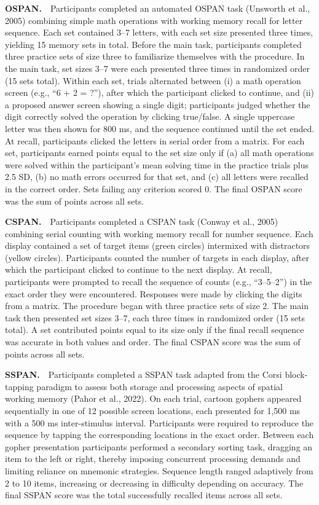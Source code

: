 \documentclass[
  ,man]{apa6}
\begin{document}
\textbf{OSPAN.}\(\quad\)Participants completed an automated OSPAN task (Unsworth et al., 2005) combining simple math operations with working memory recall for letter sequence. Each set contained 3--7 letters, with each set size presented three times, yielding 15 memory sets in total. Before the main task, participants completed three practice sets of size three to familiarize themselves with the procedure. In the main task, set sizes 3--7 were each presented three times in randomized order (15 sets total). Within each set, trials alternated between (i) a math operation screen (e.g., ``6 + 2 = ?''), after which the participant clicked to continue, and (ii) a proposed answer screen showing a single digit; participants judged whether the digit correctly solved the operation by clicking true/false. A single uppercase letter was then shown for 800 ms, and the sequence continued until the set ended. At recall, participants clicked the letters in serial order from a matrix. For each set, participants earned points equal to the set size only if (a) all math operations were solved within the participant's mean solving time in the practice trials plus 2.5 SD, (b) no math errors occurred for that set, and (c) all letters were recalled in the correct order. Sets failing any criterion scored 0. The final OSPAN score was the sum of points across all sets.

\textbf{CSPAN.}\(\quad\)Participants completed a CSPAN task (Conway et al., 2005) combining serial counting with working memory recall for number sequence. Each display contained a set of target items (green circles) intermixed with distractors (yellow circles). Participants counted the number of targets in each display, after which the participant clicked to continue to the next display. At recall, participants were prompted to recall the sequence of counts (e.g., ``3--5--2'') in the exact order they were encountered. Responses were made by clicking the digits from a matrix. The procedure began with three practice sets of size 2. The main task then presented set sizes 3--7, each three times in randomized order (15 sets total). A set contributed points equal to its size only if the final recall sequence was accurate in both values and order. The final CSPAN score was the sum of points across all sets.

\textbf{SSPAN.}\(\quad\)Participants completed a SSPAN task adapted from the Corsi block-tapping paradigm to assess both storage and processing aspects of spatial working memory (Pahor et al., 2022). On each trial, cartoon gophers appeared sequentially in one of 12 possible screen locations, each presented for 1,500 ms with a 500 ms inter-stimulus interval. Participants were required to reproduce the sequence by tapping the corresponding locations in the exact order. Between each gopher presentation participants performed a secondary sorting task, dragging an item to the left or right, thereby imposing concurrent processing demands and limiting reliance on mnemonic strategies. Sequence length ranged adaptively from 2 to 10 items, increasing or decreasing in difficulty depending on accuracy. The final SSPAN score was the total successfully recalled items across all sets.
\end{document}
